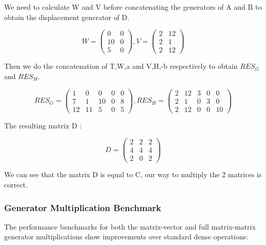 We need to calculate W and V before concatenating the generators of A
and B to obtain the displacement generator of D.

\begin{equation}
  W =
  \begin{pmatrix}
    0    & 0 \\
    10     & 0 \\
    5     & 0
  \end{pmatrix},
  V =
  \begin{pmatrix}
    2     & 12    \\
    2    & 1      \\
    2     & 12
  \end{pmatrix}
\end{equation}

Then we do the concatenation of T,W,a and V,H,-b respectively to obtain $RES_G$
and $RES_H$.

\begin{equation}
  RES_G =
  \begin{pmatrix}
    1     & 0     & 0 & 0 & 0 \\
    7    & 1     & 10 & 0 & 8 \\
    12     & 11     & 5  & 0 & 5
  \end{pmatrix},
  RES_H =
  \begin{pmatrix}
    2     & 12     & 3 & 0 & 0 \\
    2    & 1     & 0 & 3 & 0 \\
    2     & 12     & 0  & 0 & 10
  \end{pmatrix}
\end{equation}

The resulting matrix D :

\begin{equation}
  D =
  \begin{pmatrix}
    2     & 2     & 2 \\
    4     & 4     & 4 \\
    2     & 0     & 2
  \end{pmatrix}
\end{equation}

We can see that the matrix D is equal to C, our way to multiply the 2
matrices is correct.

\subsubsection{Generator Multiplication Benchmark}

The performance benchmarks for both the matrix-vector and full
matrix-matrix generator multiplications show improvements over
standard dense operations:

